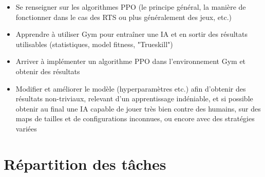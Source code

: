 \documentclass[french]{article}
\begin{document}
		\begin{itemize}
			\item Se renseigner sur les algorithmes PPO  (le principe général, la manière de fonctionner dans le cas des RTS ou plus généralement des jeux, etc.)
			\vspace{2mm}
			\item Apprendre à utiliser Gym pour entraîner une IA et en sortir des résultats utilisables (statistiques, model fitness, "Trueskill")
			\vspace{2mm}
			\item Arriver à implémenter un algorithme PPO dans l'environnement Gym et obtenir des résultats
			\vspace{2mm}
			\item Modifier et améliorer le modèle (hyperparamètres etc.) afin d'obtenir des résultats non-triviaux, relevant d'un apprentissage indéniable, et si possible obtenir au final une IA capable de jouer très bien contre des humains, sur des maps de tailles et de configurations inconnues, ou encore avec des stratégies variées
		\end{itemize}

	\section{Répartition des tâches}
	
	
		
\end{document}
